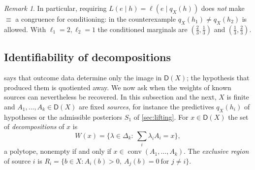 \documentclass[11pt]{article}
\theoremstyle{definition}
\theoremstyle{remark}
\newtheorem{remark}[theorem]{Remark}
\newcommand{\D}{\mathsf{D}}
\begin{document}
\begin{remark}
In particular, requiring $L(e\mid h)=\ell(e\mid q_X(h))$ does \emph{not} make $\equiv$ a congruence for
conditioning: in the counterexample $q_X(h_1)\ne q_X(h_2)$ is allowed. With $\ell_1=2,\ell_2=1$ the
conditioned marginals are $(\tfrac23,\tfrac13)$ and $(\tfrac13,\tfrac23)$.
\end{remark}

\subsection{Identifiability of decompositions}\label{sec:ident}

 says that outcome data determine only the image in $\D(X)$; the hypothesis that
produced them is quotiented away. We now ask when the weights of known sources can nevertheless be
recovered. In this subsection and the next, $X$ is finite and $A_1,\dots,A_k\in\D(X)$ are fixed
\emph{sources}, for instance the predictives $q_X(h_i)$ of hypotheses or the admissible posteriors
$S_1$ of \cref{sec:lifting}. For $x\in\D(X)$ the set of \emph{decompositions} of $x$ is
\[
W(x)=\Big\{\lambda\in\Delta_k:\ \textstyle\sum_i\lambda_iA_i=x\Big\},
\]
a polytope, nonempty if and only if $x\in\operatorname{conv}(A_1,\dots,A_k)$. The \emph{exclusive
region} of source $i$ is $R_i=\{b\in X: A_i(b)>0,\ A_j(b)=0\ \text{for } j\neq i\}$.
\end{document}
